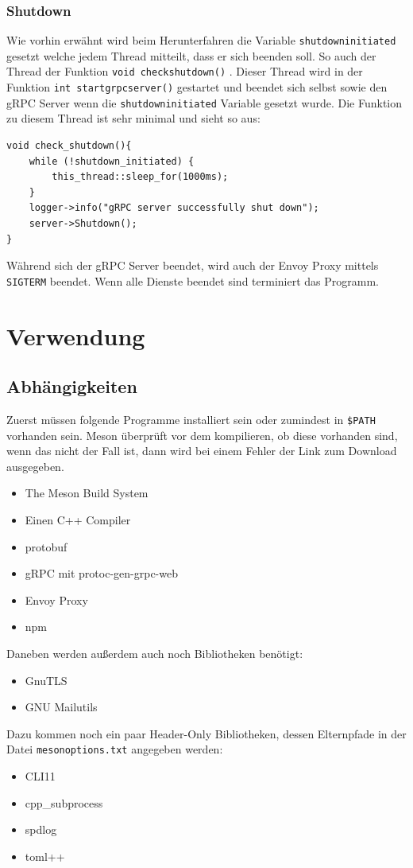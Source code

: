 \documentclass[12pt]{article}
\def\code#1{\texttt{#1}}
\begin{document}
\subsubsection{Shutdown}
Wie vorhin erwähnt wird beim Herunterfahren die Variable 
\code{shutdown\textunderscore initiated} gesetzt welche jedem Thread mitteilt, 
dass er sich beenden soll. So auch der Thread der Funktion 
\code{void check\textunderscore shutdown()} . Dieser Thread wird in der 
Funktion \code{int start\textunderscore grpc\textunderscore server()} gestartet
und beendet sich selbst sowie den gRPC Server wenn die 
\code{shutdown\textunderscore initiated} Variable gesetzt wurde. Die Funktion
zu diesem Thread ist sehr minimal und sieht so aus:
\newpage
\begin{verbatim}
void check_shutdown(){
    while (!shutdown_initiated) {
        this_thread::sleep_for(1000ms);
    }
    logger->info("gRPC server successfully shut down");
    server->Shutdown();
}
\end{verbatim}
Während sich der gRPC Server beendet, wird auch der Envoy Proxy mittels 
\code{SIGTERM} beendet. Wenn alle Dienste beendet sind terminiert das Programm.

\section{Verwendung}
\subsection{Abhängigkeiten}
Zuerst müssen folgende Programme installiert sein oder zumindest in \code{\$PATH}
vorhanden sein. Meson überprüft vor dem kompilieren, ob diese vorhanden sind,
wenn das nicht der Fall ist, dann wird bei einem Fehler der Link zum Download 
ausgegeben.
\begin{itemize}
    \item The Meson Build System \cite{meson}
    \item Einen C++ Compiler
    \item protobuf \cite{protobuf}
    \item gRPC mit protoc-gen-grpc-web \cite{protoc-gen-grpc-web}
    \item Envoy Proxy \cite{envoy}
    \item npm \cite{npm}
\end{itemize}
Daneben werden außerdem auch noch  Bibliotheken benötigt:
\begin{itemize}
    \item GnuTLS \cite{gnutls}
    \item GNU Mailutils \cite{mailutils}
\end{itemize}
\newpage
Dazu kommen noch ein paar Header-Only Bibliotheken, dessen Elternpfade in der 
Datei \code{meson\textunderscore options.txt} angegeben werden:
\begin{itemize}
    \item CLI11 \cite{cli11}
    \item cpp\_subprocess \cite{cpp-subprocess}
    \item spdlog \cite{spdlog}
    \item toml++ \cite{toml}
\end{itemize}
\end{document}

